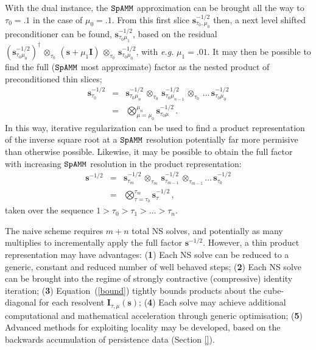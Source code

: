 \documentclass[letterpaper,twocolumn,amsmath,amsfont,amssymb,english,aps,jcp,preprintnumbers,groupaddress,nofootinbib,tightenlines,floatfix]{revtex4}
\newcommand{\mat}[1]{\boldsymbol{#1}}
\newcommand{\oto}{ {\scriptstyle \otimes}_{ \! \tau_0 } }
\newcommand{\otm}{ {\scriptstyle \otimes}_{ \! \tau_m } }
\newcommand{\otmm}{ {\scriptstyle \otimes}_{ \! \tau_{m-1}}}
\theoremstyle{plain}
\theoremstyle{remark}
\theoremstyle{plain}
\begin{document}
With the dual instance, the $\tt SpAMM$ approximation can be brought all the way to  $\tau_0 = .1$ in the case of $\mu_0 = .1$.
From this first slice  $\mat{s}^{-1/2}_{\tau_0, \mu_0}$ then, a next level shifted preconditioner can be found, 
$\mat{s}^{-1/2}_{\tau_0 \mu_1}$, based on the residual 
$\left(\mat{s}^{-1/2}_{\tau_0\mu_0} \right)^\dagger \, \oto \, \left(\mat{s}+\mu_1 \mat{I} \right)  \, \oto \,\mat{s}^{-1/2}_{\tau_0 \mu_0} $, with {\em e.g.} 
$\mu_1= .01$. It may then be possible to find the full ($\tt SpAMM$ most approximate) 
factor as the nested product of preconditioned thin slices;
\begin{eqnarray}
\mat{s}^{-1/2}_{\tau_0} &=& \mat{s}^{-1/2}_{\tau_0 \mu_n} \, \oto \, \mat{s}^{-1/2}_{\tau_0 \mu_{n-1}} \, \oto \, \dots 
\,  \mat{s}^{-1/2}_{\tau_0 \mu_0}\\
&=&\bigotimes^{\mu_n}_{\mu=\mu_0} \mat{s}^{-1/2}_{\tau_0 \mu} \, .
\end{eqnarray}In this way, 
iterative regularization can be used to find a product representation of the inverse square root at a $\tt SpAMM$ resolution 
potentially far more permisive than otherwise possible. 
Likewise, it may be possible to obtain the full factor with increasing $\tt SpAMM$ resolution in the product representation:
\begin{eqnarray}
\mat{s}^{-1/2} &=& \mat{s}^{-1/2}_{\tau_m} \, \otm \,  \mat{s}^{-1/2}_{\tau_{m-1}} \, \otmm \dots \, \mat{s}^{-1/2}_{\tau_0}\\ 
&=&\bigotimes^{\tau_m}_{\tau=\tau_0} \mat{s}^{-1/2}_{\tau} \, ,
\end{eqnarray}taken over the sequence $1 > \tau_0 > \tau_1 > \dots > \tau_n $.

The naive scheme requires $m+n$ total NS solves, and potentially as many multiplies to incrementally apply the full factor $\mat{s}^{-1/2}$.
However, a thin product representation may have advantages: ({\bf 1}) Each NS solve can be reduced 
to a generic, constant and reduced number of well behaved steps; 
({\bf 2}) Each NS solve can be brought into the regime of strongly contractive (compressive) identity iteration; 
({\bf 3}) Equation~(\ref{bound}) tightly bounds products about the cube-diagonal for each resolvent $\mat{I}_{\tau, \mu} \left( \mat{s} \right) $;
({\bf 4}) Each solve may achieve additional computational and mathematical acceleration  
through generic optimisation;
({\bf 5}) Advanced methods for exploiting locality may be developed,
based on the backwards accumulation of persistence data (Section \ref{}).
\end{document}
